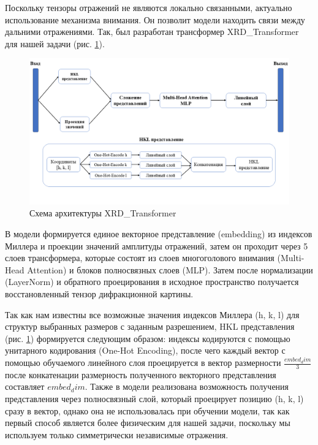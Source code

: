 Поскольку тензоры отражений не являются локально связанными, актуально использование механизма внимания. Он позволит модели находить связи между дальними отражениями. Так, был разработан трансформер XRD\_Transformer для нашей задачи (рис. \ref{XRDTrans}). 

\begin{figure}[H]
    \centering
    \includegraphics[width=1\textwidth]{figures/xrd_arch.png}
    \caption{Схема архитектуры XRD\_Transformer}
    \label{XRDTrans}
\end{figure}

В модели формируется единое векторное представление (embedding) из индексов Миллера и проекции значений амплитуды отражений, затем он проходит через 5 слоев трансформера, которые состоят из слоев многоголового внимания (Multi-Head Attention) и блоков полносвязных слоев (MLP). Затем после нормализации (LayerNorm) и обратного проецирования в исходное пространство получается восстановленный тензор дифракционной картины.

Так как нам известны все возможные значения индексов Миллера (h, k, l) для структур выбранных размеров с заданным разрешением, HKL представления (рис. \ref{XRDTrans}) формируется следующим образом: индексы кодируются с помощью унитарного кодирования (One-Hot Encoding), после чего каждый вектор с помощью обучаемого линейного слоя проецируется в вектор размерности $\frac{embed_dim}{3}$ после конкатенации размерность полученного векторного представления составляет $embed_dim$. Также в модели реализована возможность получения представления через полносвязный слой, который проецирует позицию (h, k, l) сразу в вектор, однако она не использовалась при обучении модели, так как первый способ является более физическим для нашей задачи, поскольку мы используем только симметрически независимые отражения.


